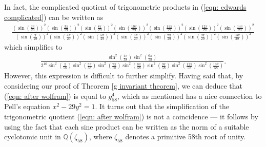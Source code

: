 \documentclass[11pt]{amsart}
\theoremstyle{definition}
\numberwithin{theorem}{section}
\begin{document}
In fact, the complicated quotient of trigonometric products in (\ref{eqn: edwards complicated}) can be written as \begin{align*}
\frac{\left(\sin\left(\frac{2\pi}{29}\right)\right)^{2}\left(\sin\left(\frac{3\pi}{29}\right)\right)^{2}\left(\sin\left(\frac{8\pi}{29}\right)\right)^{2}\left(\sin\left(\frac{10\pi}{29}\right)\right)^{2}\left(\sin\left(\frac{11\pi}{29}\right)\right)^{2}\left(\sin\left(\frac{12\pi}{29}\right)\right)^{2}\left(\sin\left(\frac{14\pi}{29}\right)\right)^{2}}{\left(\sin\left(\frac{\pi}{29}\right)\right)^{2}\left(\sin\left(\frac{4\pi}{29}\right)\right)^{2}\left(\sin\left(\frac{5\pi}{29}\right)\right)^{2}\left(\sin\left(\frac{6\pi}{29}\right)\right)^{2}\left(\sin\left(\frac{7\pi}{29}\right)\right)^{2}\left(\sin\left(\frac{9\pi}{29}\right)\right)^{2}\left(\sin\left(\frac{13\pi}{29}\right)\right)^{2}}
\end{align*}
which simplifies to 
\begin{align}\label{eqn: after wolfram}
    \frac{\sin^2\left(\frac{4\pi}{58}\right) \sin^2 \left( \frac{6\pi}{58} \right)}{2^{10} \sin^2\left( \frac{\pi}{58} \right)\sin^2\left( \frac{5\pi}{58} \right) \sin^2\left( \frac{7\pi}{58} \right) \sin^2\left( \frac{8\pi}{58} \right) \sin^2\left( \frac{9\pi}{58} \right) \sin^2\left( \frac{12\pi}{58} \right) \sin^2\left( \frac{13\pi}{58} \right)}.
\end{align}
However, this expression is difficult to further simplify. Having said that, by considering our proof of Theorem \ref{g invariant theorem}, we can deduce that (\ref{eqn: after wolfram}) is equal to $g_{58}^4$, which as mentioned has a nice connection to Pell's equation $x^2-29y^2=1$. It turns out that the simplification of the trigonometric quotient (\ref{eqn: after wolfram}) is not a coincidence --- it follows by using the fact that each sine product can be written as the norm of a suitable cyclotomic unit in $\mathbb{Q}\left(\zeta_{58}\right)$, where $\zeta_{58}$ denotes a primitive 58th root of unity.
\end{document}
